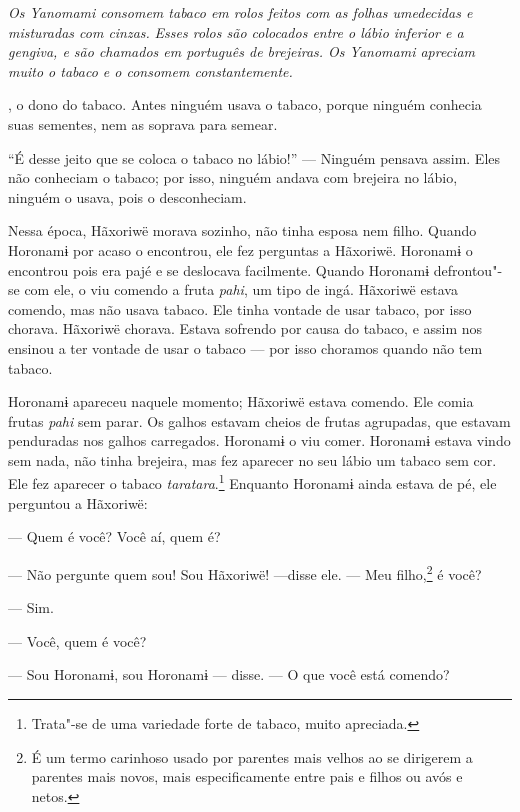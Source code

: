  

 

\emph{Os Yanomami consomem tabaco em rolos feitos com as folhas
umedecidas e misturadas com cinzas.} \emph{Esses rolos são colocados
entre o lábio inferior e a gengiva, e são chamados em português de
brejeiras. Os Yanomami apreciam muito o tabaco e o consomem
constantemente. }

 \asterisc{}

, o dono do tabaco. Antes ninguém usava o
tabaco, porque ninguém conhecia suas sementes, nem as soprava para
semear. 

 ``É desse jeito que se coloca o tabaco no lábio!'' --- Ninguém pensava
assim. Eles não conheciam o tabaco; por isso, ninguém andava com
brejeira no lábio, ninguém o usava, pois o desconheciam. 

Nessa época, Hãxoriwë morava sozinho, não tinha esposa nem
filho. Quando Horonamɨ por acaso o encontrou, ele fez
perguntas a Hãxoriwë. Horonamɨ o encontrou pois era pajé e se deslocava
facilmente. Quando Horonamɨ defrontou"-se com ele, o viu comendo a
fruta \emph{pahi}, um tipo de ingá. Hãxoriwë estava comendo, mas não
usava tabaco. Ele tinha vontade de usar tabaco, por isso chorava.
Hãxoriwë chorava. Estava sofrendo por causa do tabaco, e assim nos
ensinou a ter vontade de usar o tabaco --- por isso choramos quando não
tem tabaco. 

Horonamɨ apareceu naquele momento; Hãxoriwë estava comendo. Ele comia
frutas \emph{pahi} sem parar. Os galhos estavam cheios de frutas
agrupadas, que estavam penduradas nos galhos carregados. Horonamɨ o viu
comer. Horonamɨ estava vindo sem nada, não tinha brejeira, mas fez
aparecer no seu lábio um tabaco sem cor. Ele fez aparecer o
tabaco \emph{taratara}.\footnote{   Trata"-se de uma variedade forte de tabaco, muito apreciada.}  Enquanto Horonamɨ ainda estava
de pé, ele perguntou a Hãxoriwë: 

--- Quem é você? Você aí, quem é? 

--- Não pergunte quem sou! Sou Hãxoriwë! ---disse ele. --- Meu
filho,\footnote{   É um termo carinhoso usado por parentes mais velhos ao se dirigerem a
parentes mais novos, mais especificamente entre pais e filhos ou avós e
netos.}  é você? 

--- Sim.

--- Você, quem é você?

--- Sou Horonamɨ, sou Horonamɨ --- disse. --- O que você está comendo? 

